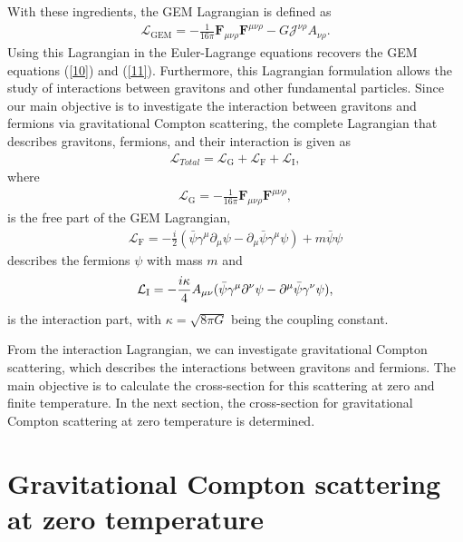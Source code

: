 \documentclass[11pt,showpacs,preprintnumbers,amsmath,amssymb,prd,nofootinbib,superscriptaddress]{revtex4-2}
\newcommand{\bea}{\begin{eqnarray}}
\newcommand{\eea}{\end{eqnarray}}
\begin{document}
With these ingredients, the GEM Lagrangian is defined as
\begin{eqnarray}
     \mathcal{L}_{\text{GEM}}=-\frac{1}{16\pi}\mathbf{F}_{\mu\nu\rho}\mathbf{F}^{\mu\nu\rho}-G\mathcal{J}^{\nu\rho} A_{\nu\rho}.
\end{eqnarray}
Using this Lagrangian in the Euler-Lagrange equations recovers the GEM equations (\ref{10}) and (\ref{11}). Furthermore, this Lagrangian formulation allows the study of interactions between gravitons and other fundamental particles. Since our main objective is to investigate the interaction between gravitons and fermions via gravitational Compton scattering, the complete Lagrangian that describes gravitons, fermions, and their interaction is given as
\bea
\mathcal{L}_{Total}= \mathcal{L}_{\text{G}}+ \mathcal{L}_{\text{F}}+ \mathcal{L}_{\text{I}},
\eea
where
\begin{eqnarray}
     \mathcal{L}_{\text{G}}=-\frac{1}{16\pi}\mathbf{F}_{\mu\nu\rho}\mathbf{F}^{\mu\nu\rho},
\end{eqnarray}
is the free part of the GEM Lagrangian,
\bea
\mathcal{L}_{\text{F}}=-\frac{i}{2}(\bar{\psi}\gamma^\mu\partial_\mu\psi-\partial_\mu\bar{\psi}\gamma^\mu\psi)+m\bar{\psi}\psi
\eea
describes the fermions $\psi$ with mass $m$ and 
\bea
 \mathcal{L}_{\text{I}}=-\frac{i\kappa}{4}A_{\mu\nu}(\Bar{\psi}\gamma^\mu\partial^\nu\psi-\partial^\mu\Bar{\psi}\gamma^\nu\psi),\label{lagrangeint}
\eea
is the interaction part, with $\kappa=\sqrt{8\pi G}$ being the coupling constant. 

From the interaction Lagrangian, we can investigate gravitational Compton scattering, which describes the interactions between gravitons and fermions. The main objective is to calculate the cross-section for this scattering at zero and finite temperature. In the next section, the cross-section for gravitational Compton scattering at zero temperature is determined.

\section{Gravitational Compton scattering at zero temperature}\label{III}
\end{document}
